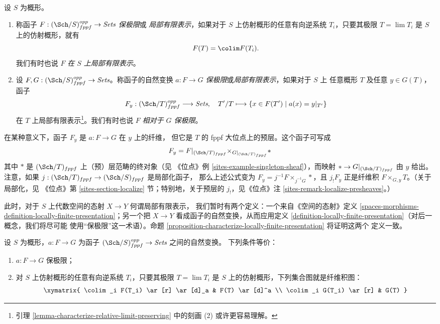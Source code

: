 \begin{definition}
\label{definition-locally-finite-presentation}
设 $S$ 为概形。
\begin{enumerate}
\item 称函子 $F : (\Sch/S)_{fppf}^{opp} \to \textit{Sets}$ {\it 保极限}或
{\it 局部有限表示}，如果对于 $S$ 上仿射概形的任意有向逆系统
$T_i$，只要其极限 $T = \lim T_i$ 是 $S$ 上的仿射概形，就有
$$
F(T) = \colim F(T_i).
$$
我们有时也说 $F$ {\it 在 $S$ 上局部有限表示}。
\item 设 $F, G : (\Sch/S)_{fppf}^{opp} \to \textit{Sets}$。称函子的自然变换
$a : F \to G$ {\it 保极限}或{\it 局部有限表示}，如果对于 $S$ 上
任意概形 $T$ 及任意 $y \in G(T)$，函子
$$
F_y : (\Sch/T)_{fppf}^{opp} \longrightarrow \textit{Sets}, \quad
T'/T \longmapsto \{x \in F(T') \mid a(x) = y|_{T'}\}
$$
在 $T$ 上局部有限表示\footnote{引理
\ref{lemma-characterize-relative-limit-preserving} 中的刻画 (2)
或许更容易理解。}。我们有时也说 $F$ {\it 相对于 $G$ 保极限}。
\end{enumerate}
\end{definition}

\noindent
在某种意义下，函子 $F_y$ 是 $a : F \to G$ 在 $y$ 上的纤维，
但它是 $T$ 的 fppf 大位点上的预层。这个函子可写成
\begin{equation}
\label{equation-fibre-map-functors}
F_y =
F|_{(\Sch/T)_{fppf}}
{\times}_{G|_{(\Sch/T)_{fppf}}}
*
\end{equation}
其中 $*$ 是 $(\Sch/T)_{fppf}$ 上（预）层范畴的终对象（见
《位点》例 \ref{sites-example-singleton-sheaf}），而映射
$* \to G|_{(\Sch/T)_{fppf}}$ 由 $y$ 给出。注意，如果
$j : (\Sch/T)_{fppf} \to (\Sch/S)_{fppf}$ 是局部化函子，
那么上述公式变为 $F_y = j^{-1}F \times_{j^{-1}G} *$，且
$j_!F_y$ 正是纤维积 $F \times_{G, y} T$。（关于局部化，见
《位点》第 \ref{sites-section-localize} 节；特别地，关于预层的
$j_!$，见《位点》注 \ref{sites-remark-localize-presheaves}。）

\medskip\noindent
此时，对于 $S$ 上代数空间的态射 $X \to Y$ 何谓局部有限表示，
我们暂时有两个定义：一个来自《空间的态射》定义
\ref{spaces-morphisms-definition-locally-finite-presentation}；另一个把
$X \to Y$ 看成函子的自然变换，从而应用定义
\ref{definition-locally-finite-presentation}（对后一概念，我们将尽可能
使用“保极限”这一术语）。命题
\ref{proposition-characterize-locally-finite-presentation} 将证明这两个
定义一致。

\begin{lemma}
\label{lemma-characterize-relative-limit-preserving}
设 $S$ 为概形，$a : F \to G$ 为函子
$(\Sch/S)_{fppf}^{opp} \to \textit{Sets}$ 之间的自然变换。
下列条件等价：
\begin{enumerate}
\item $a : F \to G$ 保极限；
\item 对 $S$ 上仿射概形的任意有向逆系统 $T_i$，只要其极限
$T = \lim T_i$ 是 $S$ 上的仿射概形，下列集合图就是纤维积图：
$$
\xymatrix{
\colim_i F(T_i) \ar[r] \ar[d]_a & F(T) \ar[d]^a \\
\colim_i G(T_i) \ar[r] & G(T)
}
$$
\end{enumerate}
\end{lemma}

